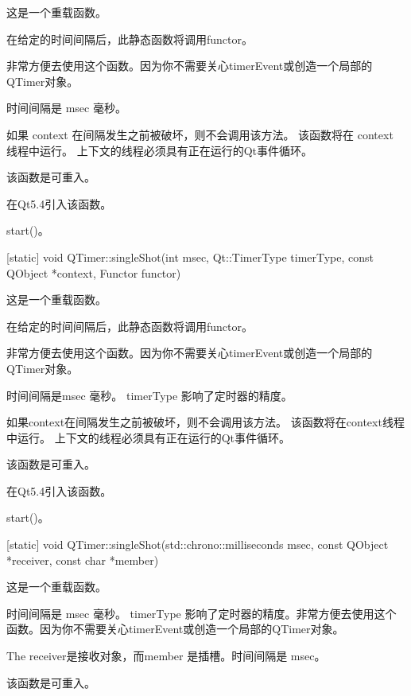 这是一个重载函数。

在给定的时间间隔后，此静态函数将调用functor。

非常方便去使用这个函数。因为你不需要关心timerEvent或创造一个局部的QTimer对象。

时间间隔是 msec 毫秒。

如果 context 在间隔发生之前被破坏，则不会调用该方法。 该函数将在 context 线程中运行。 上下文的线程必须具有正在运行的Qt事件循环。

\begin{notice}
该函数是可重入。
\end{notice}

在Qt5.4引入该函数。

\begin{notice}[另请参阅]
start()。
\end{notice}

[static] void QTimer::singleShot(int msec, Qt::TimerType timerType, const QObject *context, Functor functor)

这是一个重载函数。

在给定的时间间隔后，此静态函数将调用functor。

非常方便去使用这个函数。因为你不需要关心timerEvent或创造一个局部的QTimer对象。

时间间隔是msec 毫秒。 timerType 影响了定时器的精度。

如果context在间隔发生之前被破坏，则不会调用该方法。 该函数将在context线程中运行。 上下文的线程必须具有正在运行的Qt事件循环。

\begin{notice}
该函数是可重入。
\end{notice}

在Qt5.4引入该函数。

\begin{notice}[另请参阅]
start()。
\end{notice}

[static] void QTimer::singleShot(std::chrono::milliseconds msec, const QObject *receiver, const char *member)

这是一个重载函数。

时间间隔是 msec 毫秒。 timerType 影响了定时器的精度。非常方便去使用这个函数。因为你不需要关心timerEvent或创造一个局部的QTimer对象。

The receiver是接收对象，而member 是插槽。时间间隔是 msec。

\begin{notice}
该函数是可重入。
\end{notice}

